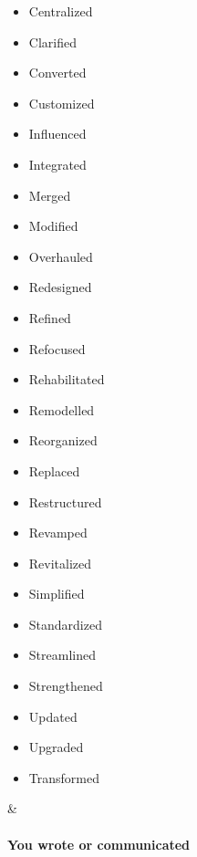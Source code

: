 \documentclass{article}
\begin{document}
\begin{longtable}
\begin{minipage}[t]{0.47\columnwidth}
\begin{itemize}
\item
  Centralized
\item
  Clarified
\item
  Converted
\item
  Customized
\item
  Influenced
\item
  Integrated
\item
  Merged
\item
  Modified
\item
  Overhauled
\item
  Redesigned
\item
  Refined
\item
  Refocused
\item
  Rehabilitated
\item
  Remodelled
\item
  Reorganized
\item
  Replaced
\item
  Restructured
\item
  Revamped
\item
  Revitalized
\item
  Simplified
\item
  Standardized
\item
  Streamlined
\item
  Strengthened
\item
  Updated
\item
  Upgraded
\item
  Transformed
\end{itemize}\strut
\end{minipage} & \begin{minipage}[t]{0.47\columnwidth}\raggedright
\hypertarget{you-wrote-or-communicated}{%
\paragraph{You wrote or communicated }\label{you-wrote-or-communicated}}


\end{minipage}
\end{longtable}
\end{document}
